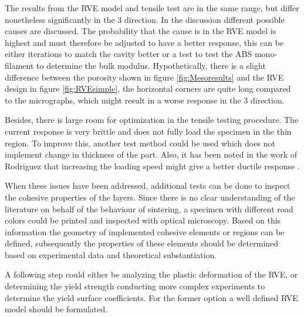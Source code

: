 The results from the RVE model and tensile test are in the same range, but differ nonetheless significantly in the 3 direction. In the discussion different possible causes are discussed. The probability that the cause is in the RVE model is highest and must therefore be adjusted to have a better response, this can be either iterations to match the cavity better or a test to test the ABS mono-filament to determine the bulk modulus. Hypothetically, there is a slight difference between the porosity shown in figure \ref{fig:Mesoresults} and the RVE design in figure \ref{fig:RVEsimple}, the horizontal corners are quite long compared to the micrographs, which might result in a worse response in the 3 direction.  

Besides, there is large room for optimization in the tensile testing procedure. The current response is very brittle and does not fully load the specimen in the thin region. To improve this, another test method could be used which does not implement change in thickness of the part. Also, it has been noted in the work of Rodriguez that increasing the loading speed might give a better ductile response \cite{Rodriguez2001MechanicalInvestigation}.

When these issues have been addressed, additional tests can be done to inspect the cohesive properties of the layers. Since there is no clear understanding of the literature on behalf of the behaviour of sintering, a specimen with different road colors could be printed and inspected with optical microscopy. Based on this information the geometry of implemented cohesive elements or regions can be defined, subsequently the properties of these elements should be determined based on experimental data and theoretical substantiation. 

A following step could either be analyzing the plastic deformation of the RVE, or determining the yield strength conducting more complex experiments to determine the yield surface coefficients. For the former option a well defined RVE model should be formulated.





\graphicspath{{chapter_4/figures/}}
\graphicspath{{chapter_2/figures/}}%